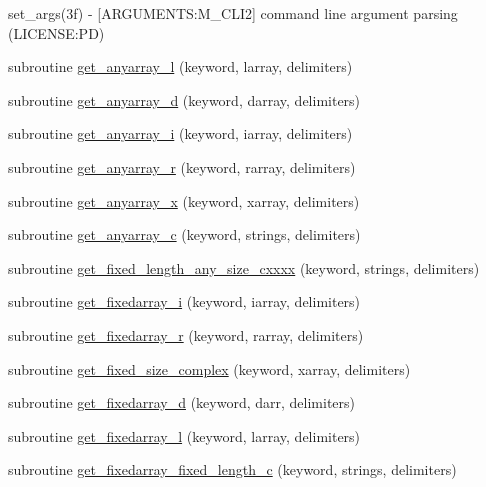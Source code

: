 \begin{DoxyCompactItemize}
\begin{DoxyCompactList}
set\+\_\+args(3f) -\/ \mbox{[}A\+R\+G\+U\+M\+E\+N\+TS\+:M\+\_\+\+C\+L\+I2\mbox{]} command line argument parsing (L\+I\+C\+E\+N\+SE\+:PD) \end{DoxyCompactList}\item 
subroutine \mbox{\hyperlink{namespacem__cli2_a47cc758d20b655bc21672c31289e54ce}{get\+\_\+anyarray\+\_\+l}} (keyword, larray, delimiters)
\item 
subroutine \mbox{\hyperlink{namespacem__cli2_aaede1f28172778cf45f4b6c04967bbbd}{get\+\_\+anyarray\+\_\+d}} (keyword, darray, delimiters)
\item 
subroutine \mbox{\hyperlink{namespacem__cli2_ad314315dd5c93abff5168265f5ff0e4e}{get\+\_\+anyarray\+\_\+i}} (keyword, iarray, delimiters)
\item 
subroutine \mbox{\hyperlink{namespacem__cli2_a8f1d5223b075f23d513c94548a1ebf09}{get\+\_\+anyarray\+\_\+r}} (keyword, rarray, delimiters)
\item 
subroutine \mbox{\hyperlink{namespacem__cli2_ab9ab288fa5f108beeb7c94d81b223b7c}{get\+\_\+anyarray\+\_\+x}} (keyword, xarray, delimiters)
\item 
subroutine \mbox{\hyperlink{namespacem__cli2_a448e8e24406f4bdbc14f26a940cbbc2c}{get\+\_\+anyarray\+\_\+c}} (keyword, strings, delimiters)
\item 
subroutine \mbox{\hyperlink{namespacem__cli2_abc31389c45dcd95b8db641b59b98b447}{get\+\_\+fixed\+\_\+length\+\_\+any\+\_\+size\+\_\+cxxxx}} (keyword, strings, delimiters)
\item 
subroutine \mbox{\hyperlink{namespacem__cli2_aa469ba94e6bb122c9bf30dd8642b693b}{get\+\_\+fixedarray\+\_\+i}} (keyword, iarray, delimiters)
\item 
subroutine \mbox{\hyperlink{namespacem__cli2_afbec790abad0dca990c0a61cd2d9e9ae}{get\+\_\+fixedarray\+\_\+r}} (keyword, rarray, delimiters)
\item 
subroutine \mbox{\hyperlink{namespacem__cli2_a32b78784e20e29bf40f17e16d08336fa}{get\+\_\+fixed\+\_\+size\+\_\+complex}} (keyword, xarray, delimiters)
\item 
subroutine \mbox{\hyperlink{namespacem__cli2_a2c8db0f383888cb2b3ce8643de3fae93}{get\+\_\+fixedarray\+\_\+d}} (keyword, darr, delimiters)
\item 
subroutine \mbox{\hyperlink{namespacem__cli2_a65ffe8c7a444db5db3be3f6edecef008}{get\+\_\+fixedarray\+\_\+l}} (keyword, larray, delimiters)
\item 
subroutine \mbox{\hyperlink{namespacem__cli2_a8000c5e05f6c84ba17350d4a00850a6a}{get\+\_\+fixedarray\+\_\+fixed\+\_\+length\+\_\+c}} (keyword, strings, delimiters)

\end{DoxyCompactItemize}
